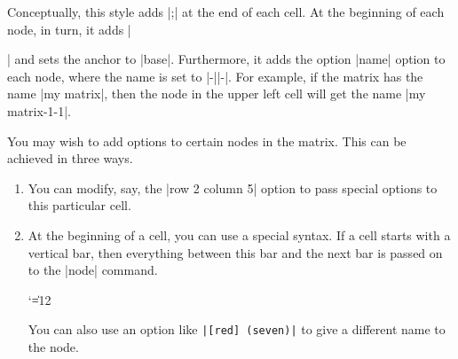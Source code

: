 \begin{itemize}
  Conceptually, this style adds |;| at
  the end of each cell. At the beginning of each node, in turn, it
  adds |\strut| and sets the anchor to |base|. Furthermore, it adds
  the option |name| option to each node, where the name is set to
  |-||-|. For
  example, if the matrix has the name |my matrix|, then the node in
  the upper left cell will get the name |my matrix-1-1|.
\begin{codeexample}[]
\end{codeexample}

  You may wish to add options to certain nodes in the matrix. This can
  be achieved in three ways.
  \begin{enumerate}
  \item You can modify, say, the
    |row 2 column 5| option to pass special options to this particular
    cell.

\begin{codeexample}[]
\end{codeexample}
    
  \item At the beginning of a cell, you can use a special syntax. If a
    cell starts with a vertical bar, then everything between this bar
    and the next bar is passed on to the |node| command.
{\catcode`\|=12
\begin{codeexample}[]
\end{codeexample}
}
  You can also use an option like \verb!|[red] (seven)|! to give a
  different name to the node.


\end{enumerate}
\end{itemize}
